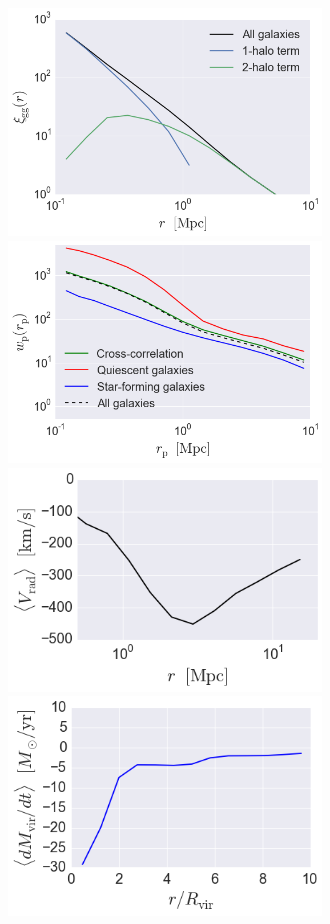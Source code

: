 \documentclass[twocolumn, tighten]{aastex6}
\begin{document}
\begin{figure}
\begin{center}
\includegraphics[width=8.3cm]{./FIGS/one_two_halo_clustering.png}
\includegraphics[width=8.3cm]{./FIGS/wp_red_blue_cross.png}
\includegraphics[width=8.3cm]{./FIGS/cluster_bcg_infall_velocity.png}
\includegraphics[width=8.3cm]{./FIGS/radial_profile_halocat_tutorial_fig1.png}

\end{center}
\end{figure}
\end{document}
